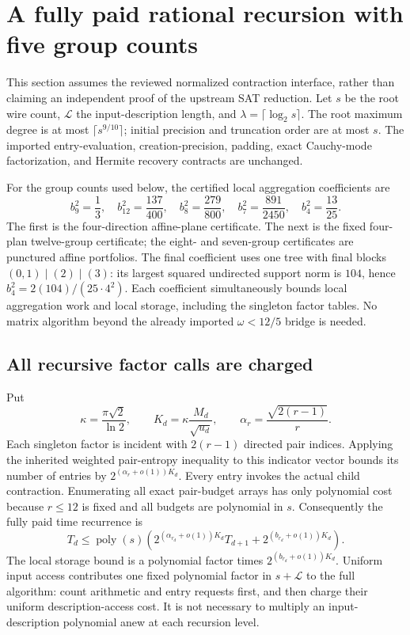 \section{A fully paid rational recursion with five group counts}
\label{sec:schedule}

This section assumes the reviewed normalized contraction interface, rather
than claiming an independent proof of the upstream SAT reduction. Let $s$
be the root wire count, $\mathcal L$ the input-description length, and
$\lambda=\lceil\log_2s\rceil$. The root maximum degree is at most
$\lceil s^{9/10}\rceil$; initial precision and truncation order are at most
$s$. The imported entry-evaluation, creation-precision, padding, exact
Cauchy-mode factorization, and Hermite recovery contracts are unchanged.

For the group counts used below, the certified local aggregation coefficients
are
\[
 b_9^2=\frac13,\quad b_{12}^2=\frac{137}{400},\quad
 b_8^2=\frac{279}{800},\quad b_7^2=\frac{891}{2450},\quad
 b_4^2=\frac{13}{25}.
\]
The first is the four-direction affine-plane certificate. The next is the
fixed four-plan twelve-group certificate; the eight- and seven-group
certificates are punctured affine portfolios. The final coefficient uses
one tree with final blocks $(0,1)\mid(2)\mid(3)$: its largest squared
undirected support norm is $104$, hence $b_4^2=2(104)/(25\cdot4^2)$.
Each coefficient simultaneously bounds local aggregation work and local
storage, including the singleton factor tables. No matrix algorithm beyond
the already imported $\omega<12/5$ bridge is needed.

\subsection{All recursive factor calls are charged}

Put
\[
 \kappa=\frac{\pi\sqrt2}{\ln2},\qquad
 K_d=\kappa\frac{M_d}{\sqrt{u_d}},\qquad
 \alpha_r=\frac{\sqrt{2(r-1)}}r.
\]
Each singleton factor is incident with $2(r-1)$ directed pair indices.
Applying the inherited weighted pair-entropy inequality to this indicator
vector bounds its number of entries by
$2^{(\alpha_r+o(1))K_d}$. Every entry invokes the actual child contraction.
Enumerating all exact pair-budget arrays has only polynomial cost because
$r\le12$ is fixed and all budgets are polynomial in $s$. Consequently the
fully paid time recurrence is
\begin{equation}\label{eq:new-paid-recurrence}
 T_d\le\operatorname{poly}(s)
 \left(2^{(\alpha_{r_d}+o(1))K_d}T_{d+1}
       +2^{(b_{r_d}+o(1))K_d}\right).
\end{equation}
The local storage bound is a polynomial factor times
$2^{(b_{r_d}+o(1))K_d}$. Uniform input access contributes one fixed
polynomial factor in $s+\mathcal L$ to the full algorithm: count arithmetic
and entry requests first, and then charge their uniform description-access
cost. It is not necessary to multiply an input-description polynomial anew
at each recursion level.

